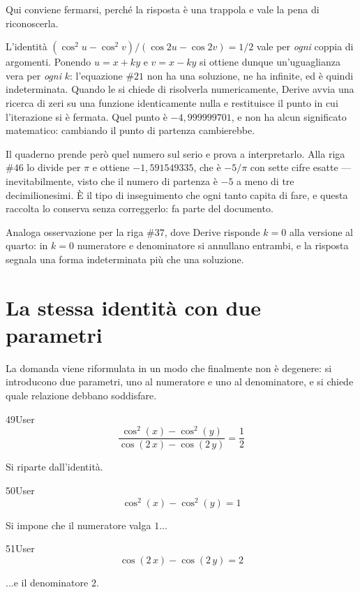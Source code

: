 Qui conviene fermarsi, perché la risposta è una trappola e vale la pena di riconoscerla.

L'identità $\left(\cos^2 u-\cos^2 v\right)/\left(\cos 2u-\cos 2v\right)=1/2$ vale per \emph{ogni} coppia di argomenti. Ponendo $u=x+ky$ e $v=x-ky$ si ottiene dunque un'uguaglianza vera per \emph{ogni} $k$: l'equazione $\#21$ non ha una soluzione, ne ha infinite, ed è quindi indeterminata. Quando le si chiede di risolverla numericamente, Derive avvia una ricerca di zeri su una funzione identicamente nulla e restituisce il punto in cui l'iterazione si è fermata. Quel punto è $-4{,}999999701$, e non ha alcun significato matematico: cambiando il punto di partenza cambierebbe.

Il quaderno prende però quel numero sul serio e prova a interpretarlo. Alla riga $\#46$ lo divide per $\pi$ e ottiene $-1{,}591549335$, che è $-5/\pi$ con sette cifre esatte — inevitabilmente, visto che il numero di partenza è $-5$ a meno di tre decimilionesimi. È il tipo di inseguimento che ogni tanto capita di fare, e questa raccolta lo conserva senza correggerlo: fa parte del documento.

Analoga osservazione per la riga $\#37$, dove Derive risponde $k=0$ alla versione al quarto: in $k=0$ numeratore e denominatore si annullano entrambi, e la risposta segnala una forma indeterminata più che una soluzione.

\section{La stessa identità con due parametri}

La domanda viene riformulata in un modo che finalmente non è degenere: si introducono due parametri, uno al numeratore e uno al denominatore, e si chiede quale relazione debbano soddisfare.

\begin{espr}{49}{User}{\verificata}
\[
\frac{\cos^{2}\!\left(x\right) - \cos^{2}\!\left(y\right)}{\cos\!\left(2\, x\right) - \cos\!\left(2\, y\right)} = \frac{1}{2}
\]
\end{espr}
Si riparte dall'identità.

\begin{espr}{50}{User}{}
\[
\cos^{2}\!\left(x\right) - \cos^{2}\!\left(y\right) = 1
\]
\end{espr}
Si impone che il numeratore valga $1$...

\begin{espr}{51}{User}{}
\[
\cos\!\left(2\, x\right) - \cos\!\left(2\, y\right) = 2
\]
\end{espr}
...e il denominatore $2$.

